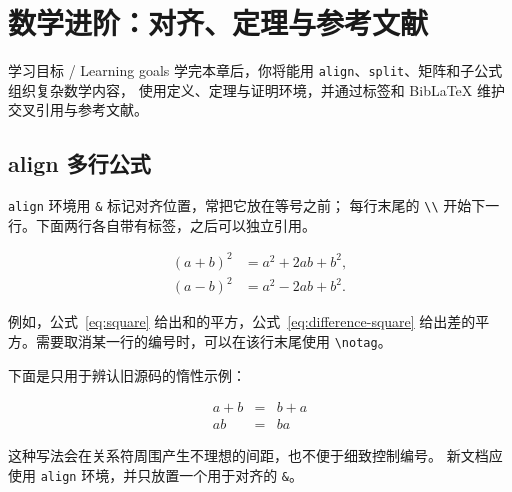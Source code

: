%
\section{数学进阶：对齐、定理与参考文献}

\begin{learningbox}{学习目标 / Learning goals}
学完本章后，你将能用 \texttt{align}、\texttt{split}、矩阵和子公式组织复杂数学内容，
使用定义、定理与证明环境，并通过标签和 BibLaTeX 维护交叉引用与参考文献。
\end{learningbox}

\subsection{align 多行公式}

\texttt{align} 环境用 \verb|&| 标记对齐位置，常把它放在等号之前；
每行末尾的 \verb|\\| 开始下一行。下面两行各自带有标签，之后可以独立引用。

\begin{align}
    (a+b)^2 &= a^2+2ab+b^2, \label{eq:square}\\
    (a-b)^2 &= a^2-2ab+b^2. \label{eq:difference-square}
\end{align}

例如，公式~\eqref{eq:square} 给出和的平方，公式~\eqref{eq:difference-square}
给出差的平方。需要取消某一行的编号时，可以在该行末尾使用 \verb|\notag|。

\begin{warningbox}
下面是只用于辨认旧源码的惰性示例：
\begin{codeblock}
\begin{eqnarray}
    a + b & = & b + a \\
    ab    & = & ba
\end{eqnarray}
\end{codeblock}
这种写法会在关系符周围产生不理想的间距，也不便于细致控制编号。
新文档应使用 \texttt{align} 环境，并只放置一个用于对齐的 \verb|&|。
\end{warningbox}

